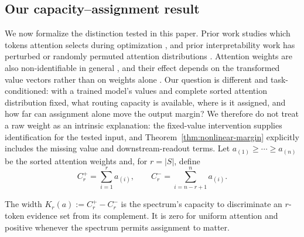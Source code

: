 \documentclass[letterpaper]{article} %
\begin{document}
\subsection{Our capacity--assignment result}

We now formalize the distinction tested in this paper.
Prior work studies which tokens attention selects during optimization \citep{maxmarginselection}, and prior
interpretability work has perturbed or randomly permuted attention distributions
\citep{jainwallace2019,wiegreffepinter2019}.
Attention weights are also non-identifiable in general \citep{brunner2020identifiability}, and their effect
depends on the transformed value vectors rather than on weights alone \citep{kobayashi2020weight}.
Our question is different and task-conditioned: with a trained model's values and complete sorted attention
distribution fixed, what routing capacity is available, where is it assigned, and how far can assignment
alone move the output margin?
We therefore do not treat a raw weight as an intrinsic explanation: the fixed-value intervention supplies
identification for the tested input, and Theorem~\ref{thm:nonlinear-margin} explicitly includes the missing
value and downstream-readout terms.
Let $a_{(1)}\ge\cdots\ge a_{(n)}$ be the sorted attention weights and, for $r=|S|$, define
\begin{equation}
C_r^+=\sum_{i=1}^{r}a_{(i)},
\qquad
C_r^-=\sum_{i=n-r+1}^{n}a_{(i)}.
\label{eq:capacity-bounds}
\end{equation}

The width $K_r(a):=C_r^+-C_r^-$ is the spectrum's capacity to discriminate an $r$-token evidence set from
its complement. It is zero for uniform attention and positive whenever the spectrum permits assignment to
matter.
\end{document}
